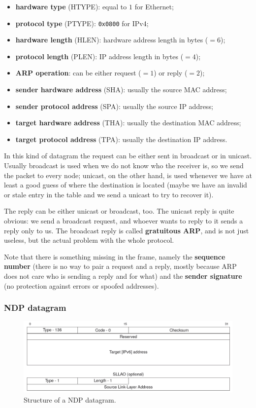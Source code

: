 \begin{itemize}
	\item \textbf{hardware type} (HTYPE): equal to $1$ for Ethernet;
	\item \textbf{protocol type} (PTYPE): \texttt{0x0800} for IPv4;
	\item \textbf{hardware length} (HLEN): hardware address length in bytes ($=6$);
	\item \textbf{protocol length} (PLEN): IP address length in bytes ($=4$);
	\item \textbf{ARP operation}: can be either request ($=1$) or reply ($=2$);
	\item \textbf{sender hardware address} (SHA): usually the source MAC address;
	\item \textbf{sender protocol address} (SPA): usually the source IP address;
	\item \textbf{target hardware address} (THA): usually the destination MAC address;
	\item \textbf{target protocol address} (TPA): usually the destination IP address.
\end{itemize}

In this kind of datagram the request can be either sent in broadcast or in unicast. Usually broadcast is used when we do not know who the receiver is, so we send the packet to every node; unicast, on the other hand, is used whenever we have at least a good guess of where the destination is located (maybe we have an invalid or stale entry in the table and we send a unicast to try to recover it).

The reply can be either unicast or broadcast, too. The unicast reply is quite obvious: we send a broadcast request, and whoever wants to reply to it sends a reply only to us. The broadcast reply is called \textbf{gratuitous ARP}, and is not just useless, but the actual problem with the whole protocol.

Note that there is something missing in the frame, namely the \textbf{sequence number} (there is no way to pair a request and a reply, mostly because ARP does not care who is sending a reply and for what) and the \textbf{sender signature} (no protection against errors or spoofed addresses).


\subsubsection{NDP datagram}
\begin{figure}[h]
    \centering
    \includegraphics[scale=0.55]{img/ndp_datagram.png}
    \decoRule
    \caption{Structure of a NDP datagram.}
    \label{fig:ndp_datagram}
\end{figure}

